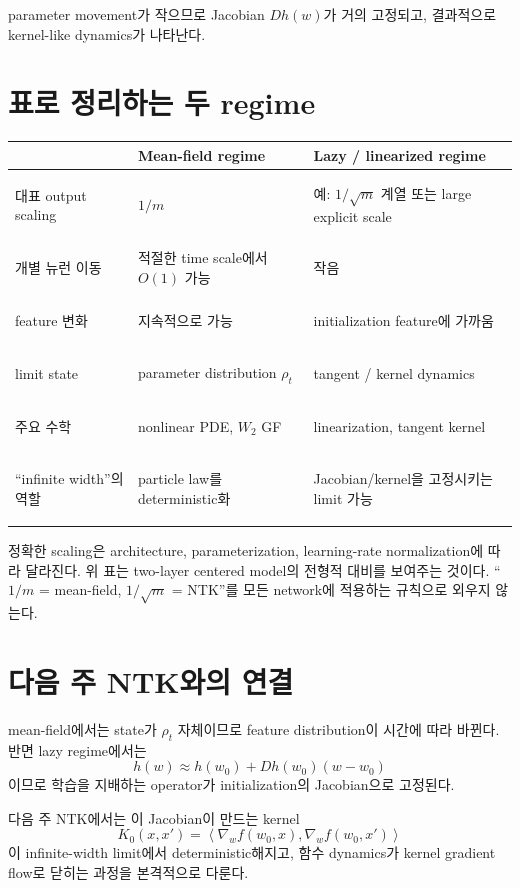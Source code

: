 \documentclass[11pt,a4paper,oneside,openany]{memoir}
\newcommand{\grad}{\nabla}
\newcommand{\inner}[2]{\left\langle #1,#2\right\rangle}
\theoremstyle{definition}
\begin{document}
parameter movement가 작으므로 Jacobian $Dh(w)$가 거의 고정되고, 결과적으로 kernel-like dynamics가 나타난다.

\section{표로 정리하는 두 regime}

\begin{center}
\small
\begin{tabularx}{\textwidth}{>{\bfseries\raggedright\arraybackslash}p{} >{\raggedright\arraybackslash}X >{\raggedright\arraybackslash}X}
\toprule
 & Mean-field regime & Lazy / linearized regime \\
\midrule
대표 output scaling & $1/m$ & 예: $1/\sqrt m$ 계열 또는 large explicit scale \\
개별 뉴런 이동 & 적절한 time scale에서 $O(1)$ 가능 & 작음 \\
feature 변화 & 지속적으로 가능 & initialization feature에 가까움 \\
limit state & parameter distribution $\rho_t$ & tangent / kernel dynamics \\
주요 수학 & nonlinear PDE, $W_2$ GF & linearization, tangent kernel \\
``infinite width''의 역할 & particle law를 deterministic화 & Jacobian/kernel을 고정시키는 limit 가능 \\
\bottomrule
\end{tabularx}
\end{center}

\begin{warningbox}
정확한 scaling은 architecture, parameterization, learning-rate normalization에 따라 달라진다.
위 표는 two-layer centered model의 전형적 대비를 보여주는 것이다.
``$1/m$ = mean-field, $1/\sqrt m$ = NTK''를 모든 network에 적용하는 규칙으로 외우지 않는다.
\end{warningbox}

\section{다음 주 NTK와의 연결}

mean-field에서는 state가 $\rho_t$ 자체이므로 feature distribution이 시간에 따라 바뀐다.
반면 lazy regime에서는
\[
  h(w)\approx h(w_0)+Dh(w_0)(w-w_0)
\]
이므로 학습을 지배하는 operator가 initialization의 Jacobian으로 고정된다.

다음 주 NTK에서는 이 Jacobian이 만드는 kernel
\[
  K_0(x,x')
  =\inner{\grad_w f(w_0,x)}{\grad_w f(w_0,x')}
\]
이 infinite-width limit에서 deterministic해지고, 함수 dynamics가 kernel gradient flow로 닫히는 과정을
본격적으로 다룬다.
\end{document}
